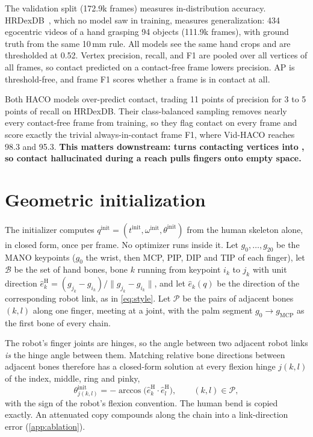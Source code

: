 
 The validation split (172.9k frames) measures in-distribution accuracy. HRDexDB~\citep{hrdexdb}, which no model saw in training, measures generalization: 434 egocentric videos of a hand grasping 94 objects (111.9k frames), with ground truth from the same 10\,mm rule. All models see the same hand crops and are thresholded at 0.52. Vertex precision, recall, and F1 are pooled over all vertices of all frames, so contact predicted on a contact-free frame lowers precision. AP is threshold-free, and frame F1 scores whether a frame is in contact at all.

 Both HACO models over-predict contact, trading 11 points of precision for 3 to 5 points of recall on HRDexDB. Their class-balanced sampling removes nearly every contact-free frame from training, so they flag contact on every frame and score exactly the trivial always-in-contact frame F1, where Vid-HACO reaches 98.3 and 95.3. \textbf{This matters downstream: \ours turns contacting vertices into \fcas, so contact hallucinated during a reach pulls fingers onto empty space.}



\section{Geometric initialization}
\label{app:init}
\label{app:skel-init}

The initializer computes $q^{\mathrm{init}} = (t^{\mathrm{init}}, \omega^{\mathrm{init}}, \theta^{\mathrm{init}})$ from the human skeleton alone, in closed form, once per frame. No optimizer runs inside it. Let $g_0, \ldots, g_{20}$ be the MANO keypoints ($g_0$ the wrist, then MCP, PIP, DIP and TIP of each finger), let $\mathcal{B}$ be the set of hand bones, bone $k$ running from keypoint $i_k$ to $j_k$ with unit direction $\hat{e}^{\mathrm{H}}_k = (g_{j_k} - g_{i_k}) / \|g_{j_k} - g_{i_k}\|$, and let $\hat{e}_k(q)$ be the direction of the corresponding robot link, as in \cref{eq:style}. Let $\mathcal{P}$ be the pairs of adjacent bones $(k, l)$ along one finger, meeting at a joint, with the palm segment $g_0 \to g_{\mathrm{MCP}}$ as the first bone of every chain.

 The robot's finger joints are hinges, so the angle between two adjacent robot links \emph{is} the hinge angle between them. Matching relative bone directions between adjacent bones therefore has a closed-form solution at every flexion hinge $j(k,l)$ of the index, middle, ring and pinky,
\begin{equation}
\label{eq:init-flex}
\theta^{\mathrm{init}}_{j(k,l)} = -\arccos\big(\hat{e}^{\mathrm{H}}_k \cdot \hat{e}^{\mathrm{H}}_l\big), \qquad (k,l) \in \mathcal{P},
\end{equation}
with the sign of the robot's flexion convention. The human bend is copied exactly. An attenuated copy compounds along the chain into a link-direction error (\cref{app:ablation}).

